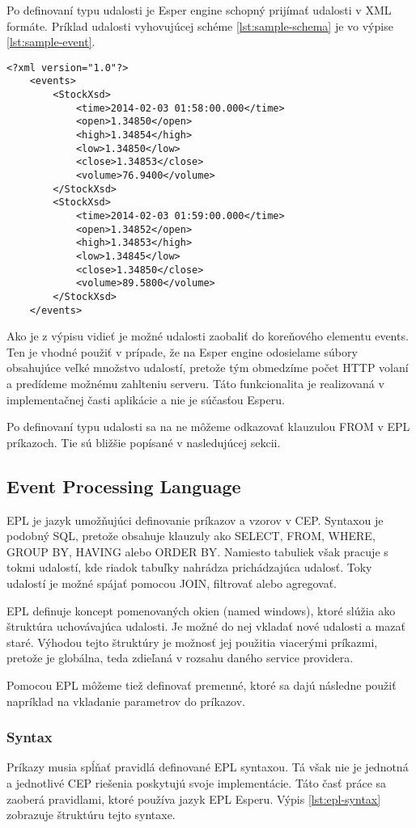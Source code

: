 	Po definovaní typu udalosti je Esper engine schopný prijímať udalosti v XML formáte. Príklad udalosti vyhovujúcej schéme \ref{lst:sample-schema} je vo výpise \ref{lst:sample-event}.
	\begin{lstlisting}[label=lst:sample-event,caption=Príklad XML udalosti]
	<?xml version="1.0"?>
	<events>
		<StockXsd>
			<time>2014-02-03 01:58:00.000</time>
			<open>1.34850</open>
			<high>1.34854</high>
			<low>1.34850</low>
			<close>1.34853</close>
			<volume>76.9400</volume>
		</StockXsd>
		<StockXsd>
			<time>2014-02-03 01:59:00.000</time>
			<open>1.34852</open>
			<high>1.34853</high>
			<low>1.34845</low>
			<close>1.34850</close>
			<volume>89.5800</volume>
		</StockXsd>
	</events>
	\end{lstlisting}
	Ako je z výpisu vidieť je možné udalosti zaobaliť do koreňového elementu events. Ten je vhodné použiť v prípade, že na Esper engine odosielame súbory obsahujúce veľké množstvo udalostí, pretože tým obmedzíme počet HTTP volaní a predídeme možnému zahlteniu serveru. Táto funkcionalita je realizovaná v implementačnej časti aplikácie a nie je súčasťou Esperu.

	Po definovaní typu udalosti sa na ne môžeme odkazovať klauzulou FROM v EPL príkazoch. Tie sú bližšie popísané v nasledujúcej sekcii.

	\subsection{Event Processing Language}
		\ac{EPL} je jazyk umožňujúci definovanie príkazov a vzorov v CEP. Syntaxou je podobný SQL, pretože obsahuje klauzuly ako SELECT, FROM, WHERE, GROUP BY, HAVING alebo ORDER BY. Namiesto tabuliek však pracuje s tokmi udalostí, kde riadok tabuľky nahrádza prichádzajúca udalosť. Toky udalostí je možné spájať pomocou JOIN, filtrovať alebo agregovať.
		
		EPL definuje koncept pomenovaných okien (named windows), ktoré slúžia ako štruk\-túra uchovávajúca udalosti. Je možné do nej vkladať nové udalosti a mazať staré. Výhodou tejto štruktúry je možnosť jej použitia viacerými príkazmi, pretože je globálna, teda zdieľaná v rozsahu daného service providera.	
		
		Pomocou EPL môžeme tiež definovať premenné, ktoré sa dajú následne použiť napríklad na vkladanie parametrov do príkazov.
		
		\subsubsection{Syntax}
		Príkazy musia spĺňať pravidlá definované EPL syntaxou. Tá však nie je jednotná a jednotlivé CEP riešenia poskytujú svoje implementácie. Táto časť práce sa zaoberá pravidlami, ktoré používa jazyk EPL Esperu. Výpis \ref{lst:epl-syntax} zobrazuje štruktúru tejto syntaxe.
		

